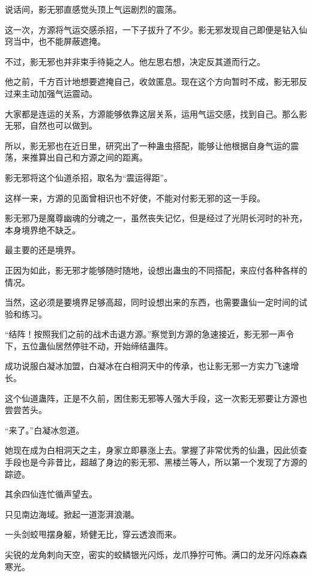 
\begin{this_body}

说话间，影无邪直感觉头顶上气运剧烈的震荡。

这一次，方源将气运交感杀招，一下子拔升了不少。影无邪发现自己即便是钻入仙窍当中，也不能屏蔽遮掩。

不过，影无邪也并非束手待毙之人。他左思右想，决定反其道而行之。

他之前，千方百计地想要遮掩自己，收敛匿息。现在这个方向暂时不成，影无邪反过来主动加强气运震动。

大家都是连运的关系，方源能够依靠这层关系，运用气运交感，找到自己。那么影无邪，自然也可以做到。

所以，影无邪也在近日里，研究出了一种蛊虫搭配，能够让他根据自身气运的震荡，来推算出自己和方源之间的距离。

影无邪将这个仙道杀招，取名为“震运得距”。

这样一来，方源的见面曾相识也不好使，不能对付影无邪的这一手段。

影无邪乃是魔尊幽魂的分魂之一，虽然丧失记忆，但是经过了光阴长河时的补充，本身境界绝不缺乏。

最主要的还是境界。

正因为如此，影无邪才能够随时随地，设想出蛊虫的不同搭配，来应付各种各样的情况。

当然，这必须是要境界足够高超，同时设想出来的东西，也需要蛊仙一定时间的试验和练习。

“结阵！按照我们之前的战术击退方源。”察觉到方源的急速接近，影无邪一声令下，五位蛊仙居然停驻不动，开始缔结蛊阵。

成功说服白凝冰加盟，白凝冰在白相洞天中的传承，也让影无邪一方实力飞速增长。

这个仙道蛊阵，正是不久前，困住影无邪等人强大手段，这一次影无邪要让方源也尝尝苦头。

“来了。”白凝冰忽道。

她现在成为白相洞天之主，身家立即暴涨上去。掌握了非常优秀的仙蛊，因此侦查手段也是今非昔比，超越了身边的影无邪、黑楼兰等人，所以第一个发现了方源的踪迹。

其余四仙连忙循声望去。

只见南边海域。掀起一道澎湃浪潮。

一头剑蛟甩摆身躯，矫健无比，穿云透浪而来。

尖锐的龙角刺向天空，密实的蛟鳞银光闪烁，龙爪狰狞可怖。满口的龙牙闪烁森森寒光。


\end{this_body}
